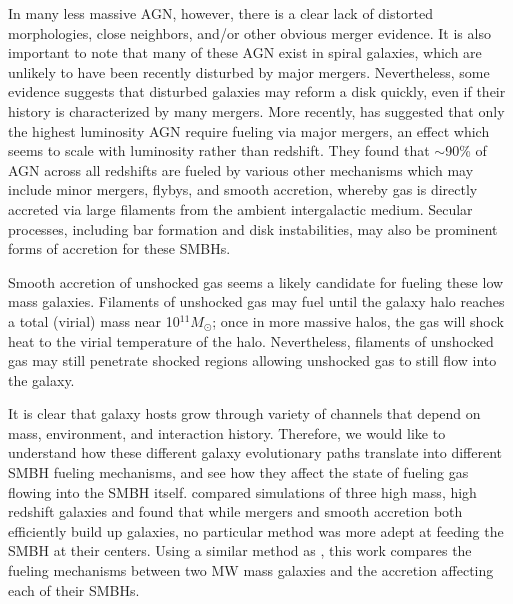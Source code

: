 \documentclass[manuscript]{aastex}
\begin{document}
In many less massive AGN, however, there is a clear lack of distorted morphologies, close neighbors, and/or other obvious merger evidence.  \citep{Ryan2007,Hicks2013} It is also important to note that many of these AGN exist in spiral galaxies, which are unlikely to have been recently disturbed by major mergers. \citep{Schawinski2011,Kocevski2011} Nevertheless, some evidence suggests \citep{Governato2009} that disturbed galaxies may reform a disk quickly, even if their history is characterized by many mergers. More recently, \cite{Treister2012} has suggested that only the highest luminosity AGN require fueling via major mergers, an effect which seems to scale with luminosity rather than redshift. They found that $\sim$90\% of AGN across all redshifts are fueled by various other mechanisms which may include minor mergers, flybys, and smooth accretion, whereby gas is directly accreted via large filaments from the ambient intergalactic medium. Secular processes, including bar formation and disk instabilities, may also be prominent forms of accretion for these SMBHs. \citep[][Possibly cite Graham, which?]{Kormendy2013}   

Smooth accretion of unshocked gas seems a likely candidate for fueling these low mass galaxies. Filaments of unshocked gas may fuel until the galaxy halo reaches a total (virial) mass near 10$^{11} M_{\odot}$; once in more massive halos, the gas will shock heat to the virial temperature of the halo. Nevertheless, filaments of unshocked gas may still penetrate shocked regions allowing unshocked gas to still flow into the galaxy. \citep{Brooks2007,Dekel2009,Keres2005}

	
It is clear that galaxy hosts grow through variety of channels that depend on mass, environment, and interaction history. Therefore, we would like to understand how these different galaxy evolutionary paths translate into different SMBH fueling mechanisms, and see how they affect the state of fueling gas flowing into the SMBH itself. \cite{Bellovary2013} compared simulations of three high mass, high redshift galaxies and found that while mergers and smooth accretion both efficiently build up galaxies, no particular method was more adept at feeding the SMBH at their centers. Using a similar method as \cite{Bellovary2013}, this work compares the fueling mechanisms between two MW mass galaxies and the accretion affecting each of their SMBHs. 
	
\end{document}
